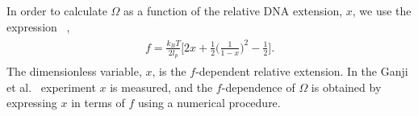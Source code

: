\documentclass[fleqn,10pt]{wlscirep}
\begin{document}

In order to calculate $\Omega$ as a function of the relative DNA extension, $x$, we use the expression ~\cite{marko1995stretching,rubinstein2003polymer},
\begin{align} 
\begin{split}
\label{eq:f}
f = \frac{k_BT}{2l_p}\Big[2x+\frac{1}{2}\Big(\frac{1}{1-x}\Big)^2-\frac{1}{2}\Big].
\end{split} 
\end{align}
The dimensionless variable, $x$, is the $f$-dependent relative extension. In the Ganji et al.~\cite{ganji2018real}  experiment $x$ is measured, and the $f$-dependence of $\Omega$ is obtained by expressing  $x$ in terms of $f$ using a numerical procedure. 

\end{document}
